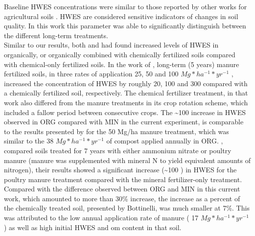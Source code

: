 	Baseline HWES concentrations were similar to those reported by other works for agricultural soils \citep{haynes2005, yousefi2008, puget1998}. HWES are considered sensitive indicators of changes in soil quality\myRed{*}. In this work this parameter was able to significantly distinguish between the different long-term treatments.\\
	Similar to our results, both \citet{yousefi2008} and \citet{bottinelli2017} had found increased levels of HWES in organically, or organically combined with chemically fertilized soils compared with chemical-only fertilized soils.
	In the work of \citet{yousefi2008}, long-term (5 years) manure fertilized soils, in three rates of application  25, 50 and 100 $ Mg * ha^{-1} * yr^{-1}  $ , increased the concentration of HWES by roughly 20, 100 and 300 \genericunit compared with a chemically fertilized soil, respectively. The chemical fertilizer treatment, in that work also differed from the manure treatments in its crop rotation scheme, which included a fallow period between consecutive crops. The \~{}100 \genericunit increase in HWES observed in ORG compared with MIN in the current experiment, is comparable to the results presented by \citeauthor{yousefi2008} for the 50 Mg/ha manure treatment, which was similar to the 38 $ Mg * ha^{-1} * yr^{-1}  $ of compost applied annually in ORG.
	\citet{bottinelli2017}, compared soils treated for 7 years with either ammonium nitrate or poultry manure (manure was supplemented with mineral N to yield equivalent amounts of nitrogen), their results  showed a significant increase (\~{}100 \genericunit) in HWES for the poultry manure treatment compared with the mineral fertilizer-only treatment.
	Compared with the difference observed between ORG and MIN in this current work, which amounted to more than 30\% increase, the increase as a percent of the  chemically treated soil, presented by Bottinelli, was much smaller at 7\%. This was attributed to the low annual application rate of manure ( 17 $ Mg * ha^{-1} * yr^{-1}  $ ) as well as high initial HWES and \gls{om} content in that soil.

